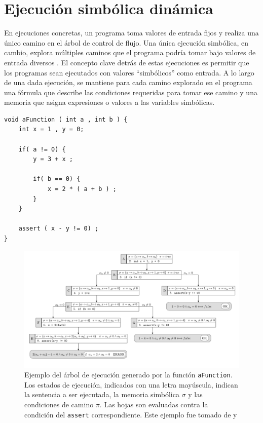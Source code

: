 \section{Ejecución simbólica dinámica}
En ejecuciones concretas, un programa toma valores de entrada fijos y realiza una único camino en el árbol de control de flujo.
Una única ejecución simbólica, en cambio, explora múltiples caminos que el programa podría tomar bajo valores de entrada diversos \cite{survey-on-symbolic-execution} \cite{symbolic-execution-three-decades-later}.
El concepto clave detrás de estas ejecuciones es permitir que los programas sean ejecutados con valores ``simbólicos'' como entrada.
A lo largo de una dada ejecución, se mantiene para cada camino explorado en el programa una fórmula que describe las condiciones requeridas para tomar ese camino y una memoria que asigna expresiones o valores a las variables simbólicas.
\begin{lstlisting}[caption={Ejemplo de código para ilustrar los árboles de ejecución simbólica},label={code:symb-exec-example}]
void aFunction ( int a , int b ) {
    int x = 1 , y = 0;
    
    if( a != 0) {
        y = 3 + x ;
    
        if( b == 0) {
            x = 2 * ( a + b ) ;
        }
    }
    
    assert ( x - y != 0) ;
}
\end{lstlisting}
\begin{figure}
    \centering
    \includegraphics[width=\textwidth]{figs/symbolic-execution-paths.png}
    \caption{Ejemplo del árbol de ejecución generado por la función \texttt{aFunction}.
        Los estados de ejecución, indicados con una letra mayúscula, indican la sentencia a ser ejecutada, la memoria simbólica $\sigma$ y las condiciones de camino $\pi$.
        Las hojas son evaluadas contra la condición del \texttt{assert} correspondiente. Este ejemplo fue tomado de \cite{vera-tesis} y \cite{survey-on-symbolic-execution}}
    \label{fig:symb-tree-example}
\end{figure}

